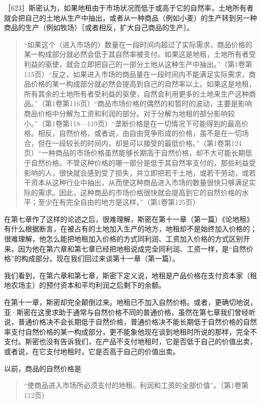［623］斯密认为，如果地租由于市场状况而低于或高于它的自然率，土地所有者就会把自己的土地从生产中抽出，或者从一种商品（例如小麦）的生产转到另一种商品的生产（例如牧场）［或者相反，扩大自己商品的生产］。

\begin{quote}{“如果这个〈进入市场的〉数量在一段时间内超过了实际需求，商品价格的某一构成部分就必然会低于其自然率被支付。如果这是地租，土地所有者受利益的驱使，就会立即把自己的一部分土地从这种生产中抽出。”（第1卷第115页）“反之，如果进入市场的商品量在一段时间内不能满足实际需求，商品价格的某一构成部分就必然会提高到自己的自然率以上。如果这是地租，所有其余的土地所有者受利益的驱使，自然会利用更多的土地来生产这种商品。”（第1卷第116页）“商品市场价格的偶然的和暂时的波动，主要是影响商品价格中分解为工资和利润的部分。对于分解为地租的部分影响较小。”（第1卷第118—119页）“垄断价格是在一切情况下可能得到的最高价格。相反，自然价格，或者说，由自由竞争形成的价格，虽不是在一切场合，但在一段较长的时间内，却是可以接受的最低价格。”（第1卷第124页）“一种商品的市场价格虽然能够长期高于自然价格，却不大可能长期低于自然价格。不管这种价格的哪一部分是低于其自然率支付的，那些利益受影响的人，很快就会感到受了损失，并立即把若干土地，或若干劳动，或若干资本从这种行业中抽出，从而使这种商品进入市场的数量很快只够满足实际的需求。因此，这种商品的市场价格很快就会提高到它的自然价格的水平；至少在有完全自由的地方是这样。”（第1卷第125页）}\end{quote}

在第七章作了这样的论述之后，很难理解，斯密在第十一章（第一篇）《论地租》有什么根据断言，在被占有的土地加入生产的地方，地租却不是始终加入价格的；很难理解，他怎么能把地租加入价格的方式同利润、工资加入价格的方式区别开来，因为他在第六章和第七章已经把地租说成完全同利润、工资一样，是“自然价格”的构成部分。现在我们回过来谈第十一章（第一篇）。

我们看到，在第六章和第七章，斯密下定义说，地租是产品价格在支付资本家（租地农场主）的预付资本和平均利润之后剩下的余额。

在第十一章，斯密却完全颠倒过来。地租已不加入自然价格。或者，更确切地说，亚·斯密在这里求助于通常与自然价格不同的普通价格，虽然在第七章我们曾经听说，普通价格决不会长期低于自然价格，普通价格决不能长期低于自然价格的自然率支付自然价格的某一构成部分，更不能象他现在谈到地租时所说的那样，完全不支付。斯密也没有告诉我们，在产品不支付地租时，它是否低于自己的价值出卖，或者说，在它支付地租时，它是否高于自己的价值出卖。

以前，商品的自然价格是

\begin{quote}{“使商品进入市场所必须支付的地租、利润和工资的全部价值”。（第1卷第112页）}\end{quote}

